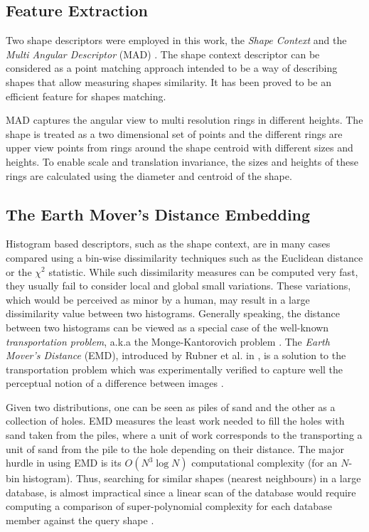 \documentclass[10pt, conference, compsocconf]{IEEEtran}
\begin{document}
\subsection{Feature Extraction}
Two shape descriptors were employed in this work, the \emph{Shape Context} \cite{belongie2002shape} and the \emph{Multi Angular Descriptor} (MAD) \cite{saabni2013multi}.
The shape context descriptor can be considered as a point matching approach intended to be a way of describing shapes that allow measuring shapes similarity. 
It has been proved to be an efficient feature for shapes matching.

MAD captures the angular view to multi resolution rings in different heights. 
The shape is treated as a two dimensional set of points and the different rings are upper view points from rings around the shape centroid with different sizes and heights. 
To enable scale and translation invariance, the sizes and heights of these rings are calculated using the diameter and centroid of the shape.

\subsection{The Earth Mover's Distance Embedding}
Histogram based descriptors, such as the shape context, are in many cases compared using a bin-wise dissimilarity techniques such as the Euclidean distance or the $\chi^2$ statistic.
While such dissimilarity measures can be computed very fast, they usually fail to consider local and global small variations. 
These variations, which would be perceived as minor by a human, may result in a large dissimilarity value between two histograms. 
Generally speaking, the distance between two histograms can be viewed as a special case of the well-known \emph{transportation problem}, a.k.a the Monge-Kantorovich problem \cite{rachev1985monge}.
The \emph{Earth Mover's Distance} (EMD), introduced by Rubner et al. in \cite{rubner2000earth}, is a solution to the transportation problem which was experimentally verified to capture well the perceptual notion of a difference between images \cite{grauman2004fast}.

Given two distributions, one can be seen as piles of sand and the other as a collection of holes. 
EMD measures the least work needed to fill the holes with sand taken from the piles, where a unit of work corresponds to the transporting a unit of sand from the pile to the hole depending on their distance.
The major hurdle in using EMD is its $O\left( {{N^3}\log N} \right)$ computational complexity (for an $N$-bin histogram). 
Thus, searching for similar shapes (nearest neighbours) in a large database, is almost impractical since a linear scan of the database would require computing a comparison of super-polynomial complexity for each database member against the query shape \cite{saabni2013efficient}. 
\end{document}
